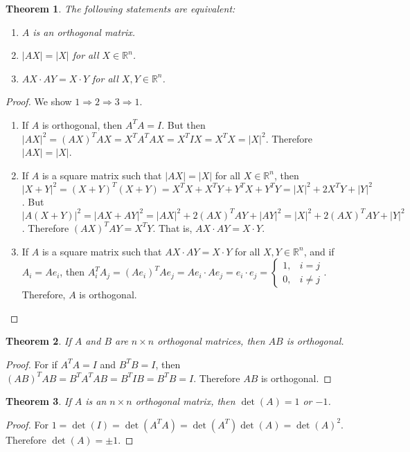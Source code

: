 \documentclass[oneside]{book}
\newtheorem{theorem}{Theorem}[section]
\theoremstyle{definition}
\begin{document}
\begin{theorem}
The following statements are equivalent:
\begin{enumerate}
\item $A$ is an orthogonal matrix.
\item $|AX| = |X|$ for all $X\in \mathbb{R}^n$.
\item $AX\cdot AY = X\cdot Y$ for all $X,Y\in \mathbb{R}^n$.
\end{enumerate}
\end{theorem}
\begin{proof}
We show $1\Rightarrow 2 \Rightarrow 3 \Rightarrow 1$.
\begin{enumerate}
\item If $A$ is orthogonal, then $A^TA = I$. But then $|AX|^2 = (AX)^TAX = X^TA^TAX = X^TIX = X^TX = |X|^2$. Therefore $|AX| = |X|$.
\item If $A$ is a square matrix such that $|AX| = |X|$ for all $X\in \mathbb{R}^n$, then $|X+Y|^2 = (X+Y)^T(X+Y) = X^TX+X^TY+Y^TX+Y^TY = |X|^2+2X^TY+|Y|^2$. But $|A(X+Y)|^2 = |AX+AY|^2 = |AX|^2+2(AX)^TAY+|AY|^2 = |X|^2+2(AX)^TAY+|Y|^2$. Therefore $(AX)^TAY = X^TY$. That is, $AX\cdot AY = X\cdot Y$.
\item If $A$ is a square matrix such that $AX\cdot AY = X\cdot Y$ for all $X,Y\in \mathbb{R}^n$, and if $A_i =  Ae_i$, then $A_i^TA_j = (Ae_i)^TAe_j = Ae_i \cdot Ae_j = e_i \cdot e_j = \begin{cases} 1, & i = j \\0, & i\ne j\end{cases}$. Therefore, $A$ is orthogonal.
\end{enumerate}
\end{proof}

\begin{theorem}
If $A$ and $B$ are $n\times n$ orthogonal matrices, then $AB$ is orthogonal.
\end{theorem}
\begin{proof}
For if $A^TA = I$ and $B^TB = I$, then $(AB)^TAB = B^TA^TAB = B^TIB = B^TB = I$. Therefore $AB$ is orthogonal.
\end{proof}

\begin{theorem}
If $A$ is an $n\times n$ orthogonal matrix, then $\det(A) = 1$ or $-1$.
\end{theorem}
\begin{proof}
For $1 = \det(I) = \det(A^TA) = \det(A^T)\det(A) = \det(A)^2$. Therefore $\det(A) = \pm 1$.
\end{proof}
\end{document}
